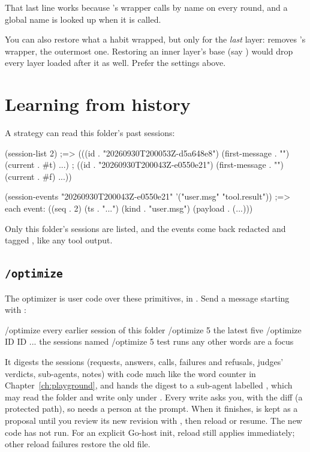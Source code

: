 That last line works because 's wrapper calls
 by name on every round, and a global name is looked up
when it is called.

\begin{careful}
You can also restore what a habit wrapped, but only for the \emph{last}
layer:  removes
's wrapper, the outermost one. Restoring an inner
layer's base (say ) would drop every layer
loaded after it as well. Prefer the settings above.
\end{careful}

\section{Learning from history}

A strategy can read this folder's past sessions:

\begin{scm}
(session-list 2)
;=> (((id . "20260930T200053Z-d5a648e8") (first-message . "") (current . #t) ...)
;    ((id . "20260930T200043Z-e0550e21") (first-message . "") (current . #f) ...))

(session-events "20260930T200043Z-e0550e21" '("user.msg" "tool.result"))
;=> each event: ((seq . 2) (ts . "...") (kind . "user.msg") (payload . (...)))
\end{scm}

Only this folder's sessions are listed, and the events come back redacted
and tagged , like any tool output.

\subsection{\texttt{/optimize}}

The optimizer is user code over these primitives, in
. Send a message starting with :

\begin{txt}
/optimize                 every earlier session of this folder
/optimize 5               the latest five
/optimize ID ID ...       the sessions named
/optimize 5 test runs     any other words are a focus
\end{txt}

It digests the sessions (requests, answers, calls, failures and refusals,
judges' verdicts, sub-agents, notes) with code much like the word counter
in Chapter~\ref{ch:playground}, and hands the digest to a sub-agent
labelled , which may read the folder and write only under
. Every write asks you, with the diff (a protected path),
so  needs a person at the prompt. When it finishes,
 is kept as a proposal until you review its new revision with
, then reload or resume. The new code has not run. For
an explicit Go-host init, reload still applies immediately; other reload failures
restore the old file.

